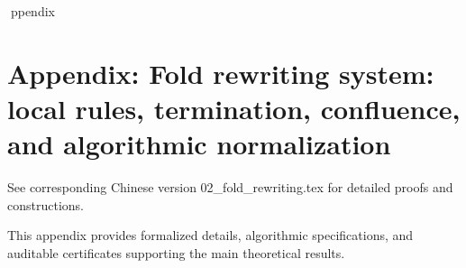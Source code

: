ppendix

\section*{Appendix: Fold rewriting system: local rules, termination, confluence, and algorithmic normalization}

See corresponding Chinese version 02_fold_rewriting.tex for detailed proofs and constructions.

This appendix provides formalized details, algorithmic specifications, and auditable certificates supporting the main theoretical results.
